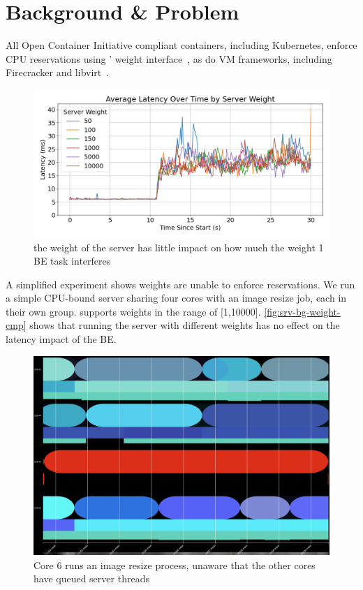 
\section{Background \& Problem}

All Open Container Initiative compliant containers, including Kubernetes,
enforce CPU reservations using \cgroups{}' weight interface~\cite{oci-cgroups,
docker-docs-cgroups, container-isolation-article}, as do VM frameworks,
including Firecracker and
libvirt~\cite{firecracker-cgroups,afaas,libvirt-cgroups}. 

\begin{figure}[t]
    \centering
    \includegraphics[width=\columnwidth]{graphs/srv-bg-weight-cmp-low.png}
    \caption{ the weight of the server has little impact on how much the
    weight 1 BE task interferes }\label{fig:srv-bg-weight-cmp}
\end{figure}


A simplified experiment shows \cgroups{} weights are unable to enforce
reservations. We run a simple CPU-bound server sharing four cores with an image
resize job, each in their own group. \cgroups{} supports weights in the range of
[1,10000]. \autoref{fig:srv-bg-weight-cmp} shows that running the server with
different weights has no effect on the latency impact of the BE.

\begin{figure}[t]
    \centering
    \includegraphics[width=\columnwidth]{graphs/schedviz-problem.png}
    \caption{Core 6 runs an image resize process, unaware that the other cores
    have queued server threads}\label{fig:schedviz-problem}
\end{figure}

